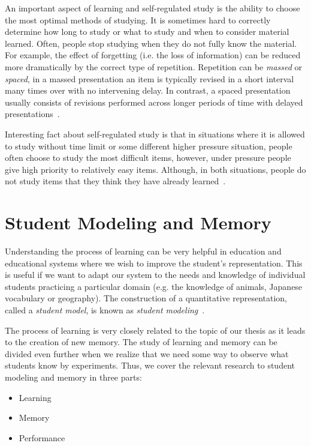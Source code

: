 An important aspect of learning and self-regulated study is the ability to choose the most optimal methods of studying. It is sometimes hard to correctly determine how long to study or what to study and when to consider material learned. Often, people stop studying when they do not fully know the material. For example, the effect of forgetting (i.e. the loss of information) can be reduced more dramatically by the correct type of repetition. Repetition can be \textit{massed} or \textit{spaced}, in a massed presentation an item is typically revised in a short interval many times over with no intervening delay. In contrast, a spaced presentation usually consists of revisions performed across longer periods of time with delayed presentations~\cite{kornell2008learning, pavlik2007optimizing}.

Interesting fact about self-regulated study is that in situations where it is allowed to study without time limit or some different higher pressure situation, people often choose to study the most difficult items, however, under pressure people give high priority to relatively easy items. Although, in both situations, people do not study items that they think they have already learned~\cite{kornell2007promise}.

\section{Student Modeling and Memory}

Understanding the process of learning can be very helpful in education and educational systems where we wish to improve the student's representation. This is useful if we want to adapt our system to the needs and knowledge of individual students practicing a particular domain (e.g. the knowledge of animals, Japanese vocabulary or geography). The construction of a quantitative representation, called a \textit{student model}, is known as \textit{student modeling}~\cite{Sison1998}.

The process of learning is very closely related to the topic of our thesis as it leads to the creation of new memory. The study of learning and memory can be divided even further when we realize that we need some way to observe what students know by experiments. Thus, we cover the relevant research to student modeling and memory in three parts:

\begin{itemize}
  \item Learning
  \item Memory
  \item Performance
\end{itemize}


